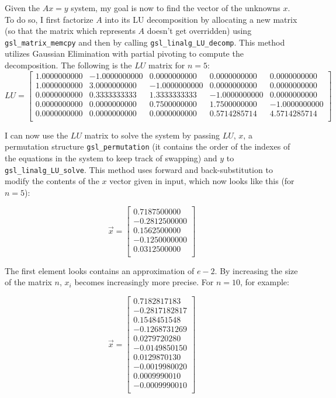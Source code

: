 \documentclass{article}
\newcommand{\code}{\texttt}
\begin{document}
Given the $Ax=y$ system, my goal is now to find the vector of the unknowns $x$. To do so, I first factorize $A$ into its LU decomposition by allocating a new matrix (so that the matrix which represents $A$ doesn't get overridden) using \code{gsl\_matrix\_memcpy} and then by calling \code{gsl\_linalg\_LU\_decomp}. This method utilizes Gaussian Elimination with partial pivoting to compute the decomposition. The following is the $LU$ matrix for $n=5$:
$$
LU=
\begin{bmatrix} 
1.0000000000 & -1.0000000000 & 0.0000000000 & 0.0000000000 & 0.0000000000\\ 
1.0000000000 & 3.0000000000 & -1.0000000000 & 0.0000000000 & 0.0000000000\\ 
0.0000000000 & 0.3333333333 & 1.3333333333 & -1.0000000000 & 0.0000000000\\ 
0.0000000000 & 0.0000000000 & 0.7500000000 & 1.7500000000 & -1.0000000000\\ 
0.0000000000 & 0.0000000000 & 0.0000000000 & 0.5714285714 & 4.5714285714\\
\end{bmatrix}
$$

I can now use the $LU$ matrix to solve the system by passing $LU$, $x$, a permutation structure \code{gsl\_permutation} (it contains the order of the indexes of the equations in the system to keep track of swapping) and $y$ to \code{gsl\_linalg\_LU\_solve}. This method uses forward and back-substitution to modify the contents of the $x$ vector given in input, which now looks like this (for $n=5$):

$$
\vec{x}=
\begin{bmatrix}
0.7187500000\\
-0.2812500000\\
0.1562500000\\
-0.1250000000\\
0.0312500000\\
\end{bmatrix}
$$

The first element looks contains an approximation of $e-2$. By increasing the size of the matrix $n$, $x_i$ becomes increasingly more precise. For $n=10$, for example:

$$
\vec{x}=
\begin{bmatrix}
0.7182817183\\
-0.2817182817\\
0.1548451548\\
-0.1268731269\\
0.0279720280\\
-0.0149850150\\
0.0129870130\\
-0.0019980020\\
0.0009990010\\
-0.0009990010\\
\end{bmatrix}
$$
\end{document}
